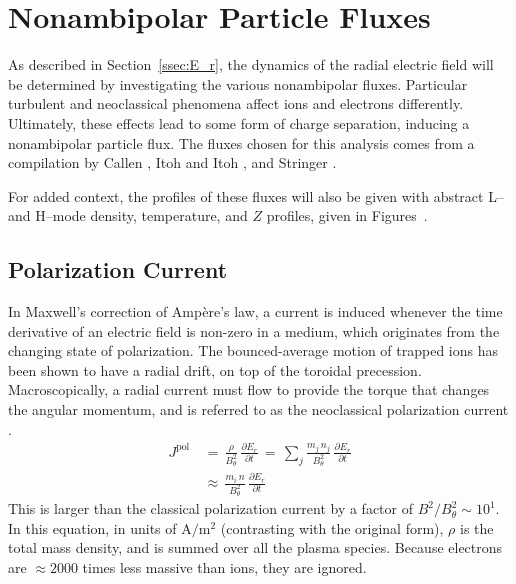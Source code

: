 \section{Nonambipolar Particle Fluxes}\label{sec:nonambipolar_fluxes}
As described in Section~\ref{ssec:E_r}, the dynamics of the radial electric field will be determined by investigating the various nonambipolar fluxes.
Particular turbulent and neoclassical phenomena affect ions and electrons differently.
Ultimately, these effects lead to some form of charge separation, inducing a nonambipolar particle flux.
The fluxes chosen for this analysis comes from a compilation by Callen \cite{callen_toroidal_2009}, Itoh and Itoh \cite{itoh_role_1996}, and Stringer \cite{stringer_explanation_1993}.

For added context, the profiles of these fluxes will also be given with abstract L-- and H--mode density, temperature, and $Z$ profiles, given in Figures~.

\subsection{Polarization Current}\label{ssec:polarization_current}
In Maxwell's correction of Amp\`ere's law, a current is induced whenever the time derivative of an electric field is non-zero in a medium, which originates from the changing state of polarization.
The bounced-average motion of trapped ions has been shown to have a radial drift, on top of the toroidal precession.
Macroscopically, a radial current must flow to provide the torque that changes the angular momentum, and is referred to as the neoclassical polarization current \cite{hinton_neoclassical_1984}.
\begin{align} %
	J^\text{pol} \,&=\, \frac{\rho}{B_\theta^2} \,
		\frac{\partial E_r}{\partial t} \,=\, \sum_j \frac{m_j \, n_j }
		{B_\theta^2} \, \frac{\partial E_r}{\partial t} \\
	\,&\approx\, \frac{m_i \, n}{B_\theta^2} \, \frac{\partial E_r}{\partial t}
		\label{eq:polarization_current_original}
\end{align}
This is larger than the classical polarization current by a factor of $B^2 / B_\theta^2 \sim 10^1$.
In this equation, in units of $\text{A}/\text{m}^2$ (contrasting with the original form), $\rho$ is the total mass density, and is summed over all the plasma species.
Because electrons are $\approx 2000$ times less massive than ions, they are ignored.

